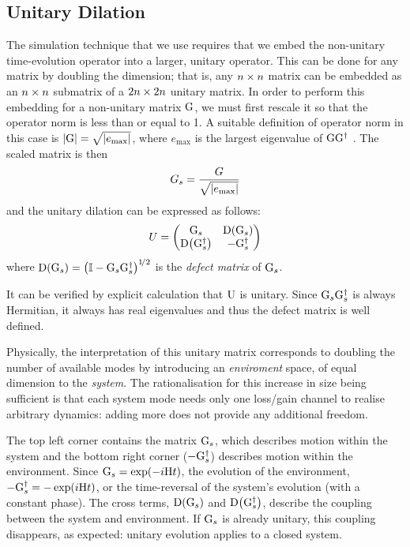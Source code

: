 \subsection{Unitary Dilation}
The simulation technique that we use requires that we embed the non-unitary
time-evolution operator into a larger, unitary operator. This can be done for
any matrix by doubling the dimension; that is, any \(n \times n\) matrix can be
embedded as an \(n \times n\) submatrix of a \(2n \times 2n\) unitary matrix. In order
to perform this embedding for a non-unitary matrix \(\mathrm{G}\), we must first
rescale it so that the operator norm is less than or equal to 1. A suitable
definition of operator norm in this case is \(\left|\mathrm{G}\right| = \sqrt{\left|e_{
\text{max}}\right|}\), where \(e_{\text{max}}\) is the largest eigenvalue of 
\(\mathrm{GG^{\dagger}}\) \cite{dilation}. The scaled matrix is then
\begin{equation}
  G_{s} = \frac{G}{\sqrt{\left|e_{\text{max}}\right|}}
\end{equation}
and the unitary dilation can be expressed as follows:
\begin{equation}
  U = \begin{pmatrix}
    \mathrm{G}_{s} & \mathrm{D}\!\left(\mathrm{G}_{s}\right) \\
    \mathrm{D}\!\left(\mathrm{G}_{s}^{\dagger}\right) & -\mathrm{G}_{s}^{\dagger} \end{pmatrix}
\end{equation}
where \(\mathrm{D}\!\left(\mathrm{G}_{s}\right) = \left( \mathbb{I} - \mathrm{G}_{s}\mathrm{G}_{s}^{
\dagger} \right)^{1\!/2}
\) is the \emph{defect matrix} of \(\mathrm{G}_{s}\).

It can be verified by explicit calculation that \(\mathrm{U}\) is unitary.
Since \(\mathrm{G}_{s}\mathrm{G}_{s}^{\dagger}\) is always Hermitian, it always has
real eigenvalues and thus the defect matrix is well defined.

Physically, the interpretation of this unitary matrix corresponds to doubling
the number of available modes by introducing an \emph{enviroment} space, of
equal dimension to the \emph{system}. The rationalisation for this increase in
size being sufficient is that each system mode needs only one loss/gain channel
to realise arbitrary dynamics: adding more does not provide any additional
freedom.

The top left corner contains the matrix
\(\mathrm{G}_{s}\), which describes motion within the system and the bottom right
corner (\(-\mathrm{G}_{s}^{\dagger}\)) describes motion within the environment.
Since \(\mathrm{G}_{s}=\exp \!\left(-i\mathrm{H}t\right)\), the evolution of the environment,
\(\mathrm{-G}_{s}^{\dagger}=-\exp \!\left(i\mathrm{H}t\right)\), or the time-reversal of the
system's evolution (with a constant phase). The cross terms, \(\mathrm{D}
\!\left(\mathrm{G}_{s}\right)\) and \(\mathrm{D} \!\left(\mathrm{G}_{s}^{
\dagger}\right) \), describe the coupling between the system and environment. If
\(\mathrm{G}_{s}\) is already unitary, this coupling disappears, as expected:
unitary evolution applies to a closed system.

